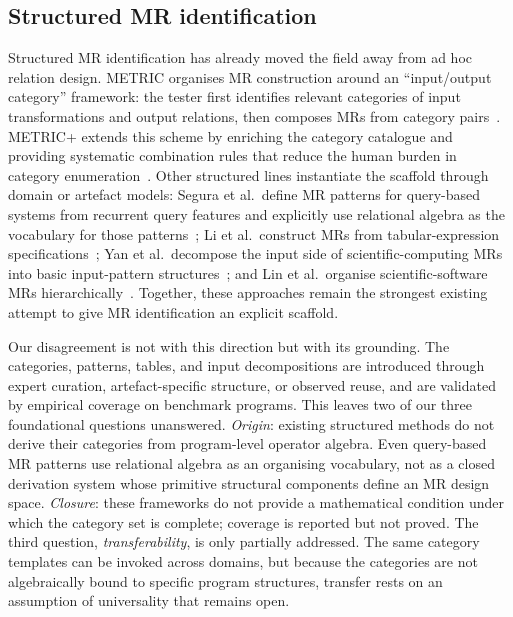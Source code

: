 \documentclass[manuscript]{acmart}
\begin{document}
\subsection{Structured MR identification}

Structured MR identification has already moved the field away from ad hoc relation design. METRIC organises MR construction around an ``input/output category'' framework: the tester first identifies relevant categories of input transformations and output relations, then composes MRs from category pairs~\cite{ChenMETRIC2016}. METRIC+ extends this scheme by enriching the category catalogue and providing systematic combination rules that reduce the human burden in category enumeration~\cite{SunMETRICplus2021}. Other structured lines instantiate the scaffold through domain or artefact models: Segura et al.\ define MR patterns for query-based systems from recurrent query features and explicitly use relational algebra as the vocabulary for those patterns~\cite{Segura2019QBSMRPatterns}; Li et al.\ construct MRs from tabular-expression specifications~\cite{Li2020TabularMR}; Yan et al.\ decompose the input side of scientific-computing MRs into basic input-pattern structures~\cite{Yan2022InputPattern}; and Lin et al.\ organise scientific-software MRs hierarchically~\cite{Lin2018HierarchicalMR}. Together, these approaches remain the strongest existing attempt to give MR identification an explicit scaffold.

Our disagreement is not with this direction but with its grounding. The categories, patterns, tables, and input decompositions are introduced through expert curation, artefact-specific structure, or observed reuse, and are validated by empirical coverage on benchmark programs. This leaves two of our three foundational questions unanswered. \emph{Origin}: existing structured methods do not derive their categories from program-level operator algebra. Even query-based MR patterns use relational algebra as an organising vocabulary, not as a closed derivation system whose primitive structural components define an MR design space. \emph{Closure}: these frameworks do not provide a mathematical condition under which the category set is complete; coverage is reported but not proved. The third question, \emph{transferability}, is only partially addressed. The same category templates can be invoked across domains, but because the categories are not algebraically bound to specific program structures, transfer rests on an assumption of universality that remains open.
\end{document}
